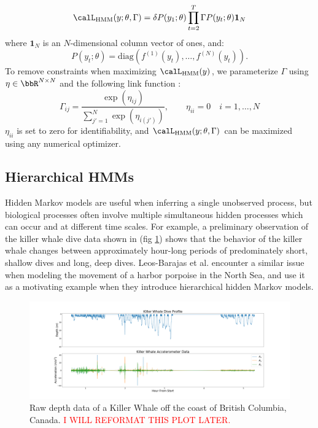 %
$$\calL_{\text{HMM}}(y;\theta,\Gamma) = \delta P(y_1;\theta) \prod_{t=2}^T \Gamma P(y_t;\theta) \mathbf{1}_N$$
%
where $\mathbf{1}_N$ is an $N$-dimensional column vector of ones, and:
%
$$P(y_t;\theta) = \text{diag}(f^{(1)}(y_t),\ldots , f^{(N)}(y_t)).$$
%
To remove constraints when maximizing $\calL_{\text{HMM}}(y)$, we parameterize $\Gamma$ using $\eta \in \bbR^{N \times N}$ and the following link function \citep{Barajas:2017}:
%
$$\Gamma_{ij} = \frac{\exp(\eta_{ij})}{\sum_{j'=1}^N \exp(\eta_{i(j')})}, \qquad \eta_{ii} = 0 \quad i = 1, \ldots, N$$
%
$\eta_{ii}$ is set to zero for identifiability, and $\calL_{\text{HMM}}(y;\theta,\Gamma)$ can be maximized using any numerical optimizer.

\subsection{Hierarchical HMMs}

Hidden Markov models are useful when inferring a single unobserved process, but biological processes often involve multiple simultaneous hidden processes which can occur and at different time scales. For example, a preliminary observation of the killer whale dive data shown in (fig \ref{fig:data}) shows that the behavior of the killer whale changes between approximately hour-long periods of predominately short, shallow dives and long, deep dives. Leos-Barajas et al. \citep{Barajas:2017} encounter a similar issue when modeling the movement of a harbor porpoise in the North Sea, and use it as a motivating example when they introduce hierarchical hidden Markov models.

\begin{figure}[h!]
	\centering
	\includegraphics[width=5.5in]{../Plots/raw_data.png}
	\caption{Raw depth data of a Killer Whale off the coast of British Columbia, Canada. \textcolor{red}{I WILL REFORMAT THIS PLOT LATER.}}
	\label{fig:data}
\end{figure}

